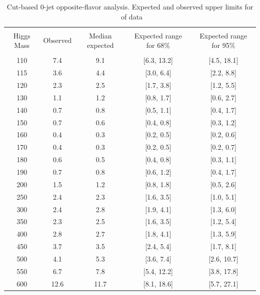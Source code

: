 \begin{table}[!hbp]
\begin{center}
\begin{tabular}{c c c c c}
\hline
\vspace{-3mm} && \\
 Higgs Mass   & Observed & Median expected & Expected range for 68\% & Expected range for 95\%   \\
\vspace{-3mm} && \\
\hline
110 & 7.4 & 9.1 & [6.3, 13.2] & [4.5, 18.1] \\
115 & 3.6 & 4.4 & [3.0, 6.4] & [2.2, 8.8] \\
120 & 2.3 & 2.5 & [1.7, 3.8] & [1.2, 5.5] \\
130 & 1.1 & 1.2 & [0.8, 1.7] & [0.6, 2.7] \\
140 & 0.7 & 0.8 & [0.5, 1.1] & [0.4, 1.7] \\
150 & 0.7 & 0.6 & [0.4, 0.8] & [0.3, 1.2] \\
160 & 0.4 & 0.3 & [0.2, 0.5] & [0.2, 0.6] \\
170 & 0.4 & 0.3 & [0.2, 0.5] & [0.2, 0.7] \\
180 & 0.6 & 0.5 & [0.4, 0.8] & [0.3, 1.1] \\
190 & 0.7 & 0.8 & [0.6, 1.2] & [0.4, 1.7] \\
200 & 1.5 & 1.2 & [0.8, 1.8] & [0.5, 2.6] \\
250 & 2.4 & 2.3 & [1.6, 3.5] & [1.0, 5.1] \\
300 & 2.4 & 2.8 & [1.9, 4.1] & [1.3, 6.0] \\
350 & 2.3 & 2.5 & [1.6, 3.5] & [1.2, 5.4] \\
400 & 2.8 & 2.7 & [1.8, 4.1] & [1.3, 5.9] \\
450 & 3.7 & 3.5 & [2.4, 5.4] & [1.7, 8.1] \\
500 & 4.1 & 5.3 & [3.6, 7.4] & [2.6, 10.7] \\
550 & 6.7 & 7.8 & [5.4, 12.2] & [3.8, 17.8] \\
600 & 12.6 & 11.7 & [8.1, 18.6] & [5.7, 27.1] \\
\hline
\end{tabular}
\caption{Cut-based 0-jet opposite-flavor analysis. Expected and observed
  upper limits for \intlumi\ of data}
\label{tab:sf0_cut}
\end{center}
\end{table}
